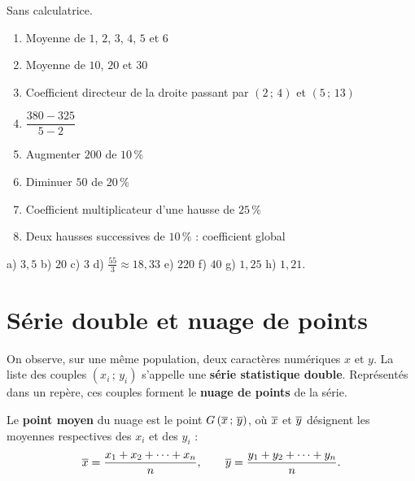 \begin{automatismes}
Sans calculatrice.

\begin{enumerate}[label=\textbf{\alph*)}, leftmargin=*, itemsep=0.25em]
  \item Moyenne de $1$, $2$, $3$, $4$, $5$ et $6$
  \item Moyenne de $10$, $20$ et $30$
  \item Coefficient directeur de la droite passant par $(2\,;\,4)$ et
        $(5\,;\,13)$
  \item $\dfrac{380-325}{5-2}$
  \item Augmenter $200$ de $10\,\%$
  \item Diminuer $50$ de $20\,\%$
  \item Coefficient multiplicateur d'une hausse de $25\,\%$
  \item Deux hausses successives de $10\,\%$ : coefficient global
\end{enumerate}
\end{automatismes}

\begin{corrige}[automatismes]
a) $3{,}5$ \quad b) $20$ \quad c) $3$ \quad d) $\frac{55}{3} \approx 18{,}33$
\quad e) $220$ \quad f) $40$ \quad g) $1{,}25$ \quad h) $1{,}21$.
\end{corrige}

\section{Série double et nuage de points}

\begin{definition}
On observe, sur une même population, deux caractères numériques $x$ et $y$.
La liste des couples $\left(x_{i}\,;\,y_{i}\right)$ s'appelle une
\textbf{série statistique double}. Représentés dans un repère, ces couples
forment le \textbf{nuage de points} de la série.
\end{definition}

\begin{definition}
Le \textbf{point moyen} du nuage est le point
$G\left(\overline{x}\,;\,\overline{y}\right)$, où $\overline{x}$ et $\overline{y}$
désignent les moyennes respectives des $x_{i}$ et des $y_{i}$ :
\[
  \overline{x} = \frac{x_{1}+x_{2}+\cdots+x_{n}}{n}, \qquad
  \overline{y} = \frac{y_{1}+y_{2}+\cdots+y_{n}}{n}.
\]
\end{definition}

